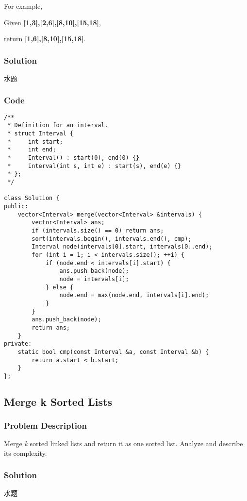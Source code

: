 \documentclass[courier]{article}
\begin{document}
\begin{CJK*}{UTF8}{gkai}
For example,


Given \textbf{[1,3],[2,6],[8,10],[15,18]},


return \textbf{[1,6],[8,10],[15,18]}.



\subsubsection*{Solution}
水题

\subsubsection*{Code}
\begin{lstlisting}
/**
 * Definition for an interval.
 * struct Interval {
 *     int start;
 *     int end;
 *     Interval() : start(0), end(0) {}
 *     Interval(int s, int e) : start(s), end(e) {}
 * };
 */
 
class Solution {
public:
    vector<Interval> merge(vector<Interval> &intervals) {
        vector<Interval> ans;
        if (intervals.size() == 0) return ans;
        sort(intervals.begin(), intervals.end(), cmp);
        Interval node(intervals[0].start, intervals[0].end);
        for (int i = 1; i < intervals.size(); ++i) {
            if (node.end < intervals[i].start) {
                ans.push_back(node);
                node = intervals[i];
            } else {
                node.end = max(node.end, intervals[i].end);
            }
        }
        ans.push_back(node);
        return ans;
    }
private:
    static bool cmp(const Interval &a, const Interval &b) {
        return a.start < b.start;
    }
}; 
\end{lstlisting}


\subsection{ Merge k Sorted Lists }

\subsubsection*{Problem Description}
Merge \emph{k} sorted linked lists and return it as one sorted list. Analyze and describe its complexity.



\subsubsection*{Solution}
水题


\end{CJK*}
\end{document}
